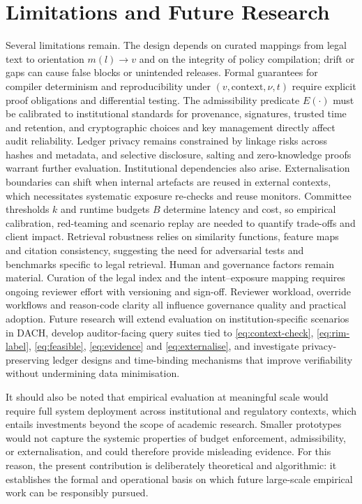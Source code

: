 \documentclass[oneside,10pt]{swissi}
\begin{document}
\section{Limitations and Future Research}
Several limitations remain. The design depends on curated mappings from legal text to orientation \(m(l)\to v\) and on the integrity of policy compilation; drift or gaps can cause false blocks or unintended releases. Formal guarantees for compiler determinism and reproducibility under \((v,\text{context},\nu,t)\) require explicit proof obligations and differential testing. The admissibility predicate \(E(\cdot)\) must be calibrated to institutional standards for provenance, signatures, trusted time and retention, and cryptographic choices and key management directly affect audit reliability. Ledger privacy remains constrained by linkage risks across hashes and metadata, and selective disclosure, salting and zero-knowledge proofs warrant further evaluation. Institutional dependencies also arise. Externalisation boundaries can shift when internal artefacts are reused in external contexts, which necessitates systematic exposure re-checks and reuse monitors. Committee thresholds \(k\) and runtime budgets \(B\) determine latency and cost, so empirical calibration, red-teaming and scenario replay are needed to quantify trade-offs and client impact. Retrieval robustness relies on similarity functions, feature maps and citation consistency, suggesting the need for adversarial tests and benchmarks specific to legal retrieval. Human and governance factors remain material. Curation of the legal index and the intent–exposure mapping requires ongoing reviewer effort with versioning and sign-off. Reviewer workload, override workflows and reason-code clarity all influence governance quality and practical adoption. Future research will extend evaluation on institution-specific scenarios in DACH, develop auditor-facing query suites tied to \eqref{eq:context-check}, \eqref{eq:rim-label}, \eqref{eq:feasible}, \eqref{eq:evidence} and \eqref{eq:externalise}, and investigate privacy-preserving ledger designs and time-binding mechanisms that improve verifiability without undermining data minimisation.

It should also be noted that empirical evaluation at meaningful scale would require full system deployment across institutional and regulatory contexts, which entails investments beyond the scope of academic research. Smaller prototypes would not capture the systemic properties of budget enforcement, admissibility, or externalisation, and could therefore provide misleading evidence. For this reason, the present contribution is deliberately theoretical and algorithmic: it establishes the formal and operational basis on which future large-scale empirical work can be responsibly pursued.

\bigskip

\bigskip

\printbibliography

\swDeclarationsPage
\end{document}
